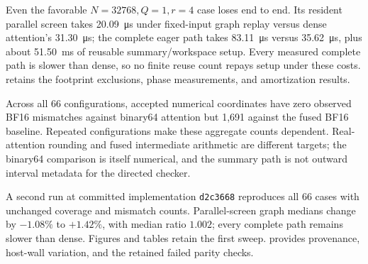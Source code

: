 Even the favorable $N=32768,Q=1,r=4$ case loses end to end. Its resident
parallel screen takes \SI{20.09}{\micro\second} under fixed-input graph replay
versus dense attention's \SI{31.30}{\micro\second}; the complete eager path
takes \SI{83.11}{\micro\second} versus \SI{35.62}{\micro\second}, plus about
\SI{51.50}{\milli\second} of reusable summary/workspace setup. Every measured
complete path is slower than dense, so no finite reuse count repays setup
under these costs.  retains the footprint exclusions,
phase measurements, and amortization results.

\begin{samepage}
Across all 66 configurations, accepted numerical coordinates have zero observed
BF16 mismatches against binary64 attention but 1,691 against the fused BF16
baseline. Repeated configurations make these aggregate counts dependent.
Real-attention rounding and fused intermediate arithmetic are different
targets; the binary64 comparison is itself numerical, and the summary path is
not outward interval metadata for the directed checker.
\par
\end{samepage}


\begin{samepage}
A second run at committed implementation \texttt{d2c3668} reproduces all
66 cases with unchanged coverage and mismatch counts. Parallel-screen graph
medians change by $-1.08\%$ to $+1.42\%$, with median ratio $1.002$; every
complete path remains slower than dense. Figures and tables retain the first
sweep.  provides provenance, host-wall variation,
and the retained failed parity checks.
\par
\end{samepage}
